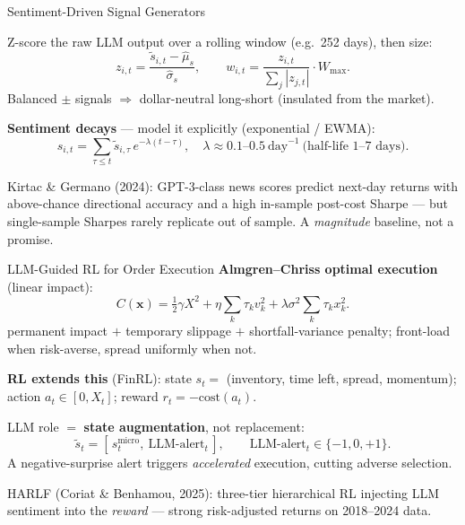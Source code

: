 \documentclass[9pt,t]{beamer}
\begin{document}
\begin{frame}{Sentiment-Driven Signal Generators}
\begin{underhood}
Z-score the raw LLM output over a rolling window (e.g.\ 252 days), then size:
\[
z_{i,t}=\frac{\tilde s_{i,t}-\hat\mu_s}{\hat\sigma_s},
\qquad
w_{i,t}=\frac{z_{i,t}}{\sum_j|z_{j,t}|}\cdot W_{\max}.
\]
Balanced $\pm$ signals $\Rightarrow$ dollar-neutral long-short (insulated from the market).
\end{underhood}

\medskip
\textbf{Sentiment decays} --- model it explicitly (exponential / EWMA):
\[
s_{i,t}=\sum_{\tau\le t}\tilde s_{i,\tau}\,e^{-\lambda(t-\tau)},
\quad \lambda\approx 0.1\text{--}0.5\ \text{day}^{-1}\ \text{(half-life 1--7 days)}.
\]

\medskip
\footnotesize Kirtac \& Germano (2024): GPT-3-class news scores predict next-day returns
with above-chance directional accuracy and a high in-sample post-cost Sharpe ---
but single-sample Sharpes rarely replicate out of sample. A \emph{magnitude} baseline,
not a promise.
\end{frame}

\begin{frame}{LLM-Guided RL for Order Execution}
\textbf{Almgren--Chriss optimal execution} (linear impact):
\[
C(\mathbf{x})=\tfrac{1}{2}\gamma X^2+\eta\sum_{k}\tau_k v_k^2+\lambda\sigma^2\sum_{k}\tau_k x_k^2.
\]
\footnotesize permanent impact $+$ temporary slippage $+$ shortfall-variance penalty;
front-load when risk-averse, spread uniformly when not.

\normalsize
\medskip
\textbf{RL extends this} (FinRL): state $s_t=$ (inventory, time left, spread, momentum);
action $a_t\in[0,X_t]$; reward $r_t=-\text{cost}(a_t)$.

\begin{underhood}
LLM role $=$ \textbf{state augmentation}, not replacement:
\[
\tilde s_t=[\,s_t^{\text{micro}},\ \text{LLM-alert}_t\,],\qquad
\text{LLM-alert}_t\in\{-1,0,+1\}.
\]
A negative-surprise alert triggers \emph{accelerated} execution, cutting adverse selection.
\end{underhood}
\footnotesize HARLF (Coriat \& Benhamou, 2025): three-tier hierarchical RL injecting LLM
sentiment into the \emph{reward} --- strong risk-adjusted returns on 2018--2024 data.
\end{frame}
\end{document}
